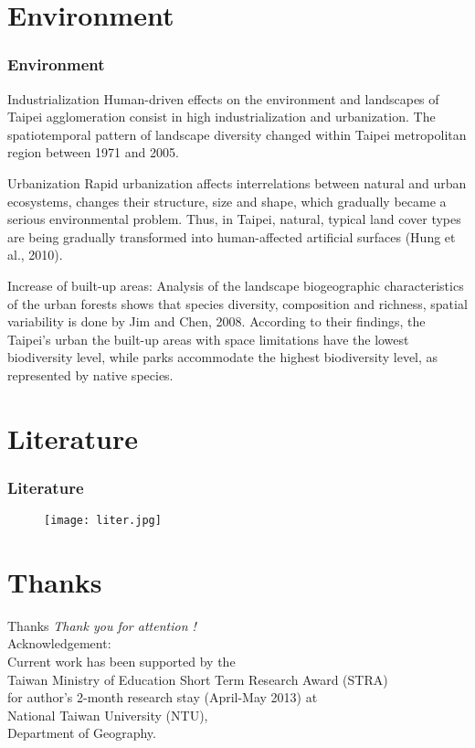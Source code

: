 \documentclass[pdflatex,compress,8pt,
	xcolor={dvipsnames,dvipsnames,svgnames,x11names,table},
	hyperref={colorlinks = true,breaklinks = true, urlcolor = NavyBlue, breaklinks = true}]{beamer}
\begin{document}
\section{Environment}
\begin{frame}\frametitle{Environment}

\begin{alertblock}{Industrialization}
Human-driven effects on the environment and landscapes of Taipei agglomeration consist in \alert{high industrialization and urbanization}.
The spatiotemporal pattern of landscape diversity changed within Taipei metropolitan region between 1971 and 2005.
\end{alertblock}

\begin{block}{Urbanization}
Rapid urbanization affects \alert{interrelations between natural and urban ecosystems}, changes their \alert{structure, size} and \alert{shape}, which gradually became a serious environmental problem. Thus, in Taipei, natural, typical land cover types are being gradually transformed into human-affected artificial surfaces (Hung et al., 2010).
\end{block}

\begin{examples}{Increase of built-up areas:}
Analysis of the landscape biogeographic characteristics of the urban forests shows that species diversity, composition and richness, spatial variability is done by Jim and Chen, 2008. According to their findings, the Taipei's urban the built-up areas with space limitations have the \alert{lowest biodiversity level}, while parks accommodate the \alert{highest biodiversity level}, as represented by native species.
\end{examples}

\end{frame}

\section{Literature}
\begin{frame}\frametitle{Literature}
\begin{figure}[H]
	\centering
		\texttt{[image: liter.jpg]}
\end{figure}
\end{frame}

\section{Thanks}
\begin{frame}{Thanks}
  	\centering \LARGE 
	\emph{Thank you for attention !}\\
	\vspace{5em}
\normalsize
Acknowledgement: \\
Current work has been supported by the \\
Taiwan Ministry of Education Short Term Research Award (STRA) \\
for author's 2-month research stay (April-May 2013) at\\
National Taiwan University (NTU), \\
Department of Geography.
\end{frame}
\end{document}
